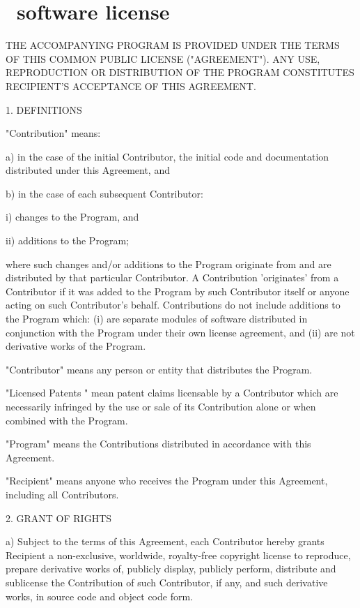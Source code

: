 \section{\iSAMName\ software license\label{sec:Common-Public-License}}
\CH

\begin{scriptsize}
THE ACCOMPANYING PROGRAM IS PROVIDED UNDER THE TERMS OF THIS COMMON PUBLIC LICENSE ("AGREEMENT"). ANY USE, REPRODUCTION OR DISTRIBUTION OF THE PROGRAM CONSTITUTES RECIPIENT'S ACCEPTANCE OF THIS AGREEMENT.

1. DEFINITIONS

"Contribution" means:

a) in the case of the initial Contributor, the initial code and documentation distributed under this Agreement, and

b) in the case of each subsequent Contributor:

 \hspace{0.3cm} i) changes to the Program, and

 \hspace{0.3cm} ii) additions to the Program;

where such changes and/or additions to the Program originate from and are distributed by that particular Contributor. A Contribution 'originates' from a Contributor if it was added to the Program by such Contributor itself or anyone acting on such Contributor's behalf. Contributions do not include additions to the Program which: (i) are separate modules of software distributed in conjunction with the Program under their own license agreement, and (ii) are not derivative works of the Program.

"Contributor" means any person or entity that distributes the Program.

"Licensed Patents " mean patent claims licensable by a Contributor which are necessarily infringed by the use or sale of its Contribution alone or when combined with the Program.

"Program" means the Contributions distributed in accordance with this Agreement.

"Recipient" means anyone who receives the Program under this Agreement, including all Contributors.

2. GRANT OF RIGHTS

a) Subject to the terms of this Agreement, each Contributor hereby grants Recipient a non-exclusive, worldwide, royalty-free copyright license to reproduce, prepare derivative works of, publicly display, publicly perform, distribute and sublicense the Contribution of such Contributor, if any, and such derivative works, in source code and object code form. 


\end{scriptsize}
